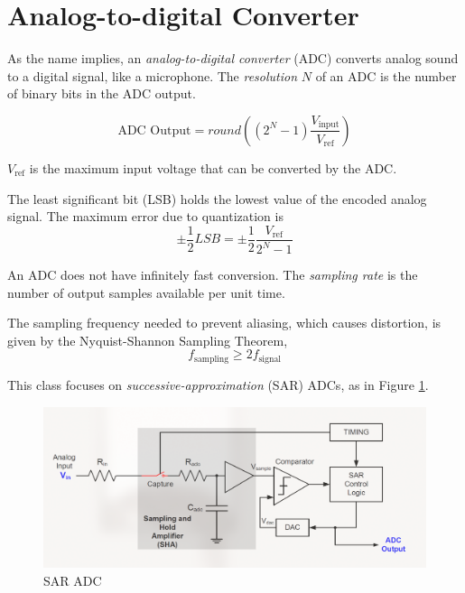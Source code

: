 \section{Analog-to-digital Converter}

As the name implies, an \emph{analog-to-digital converter}
(ADC) converts analog sound to a digital signal, like a
microphone.
The \emph{resolution} $N$ of an ADC is the number of binary bits
in the ADC output.

\begin{equation}
    \text{ADC Output} = round\left( (2^N - 1)\frac{V_{\text{input}}}{V_{\text{ref}}} \right)
\end{equation}

$V_{\text{ref}}$ is the maximum input voltage that can be converted by the ADC.

The least significant bit (LSB) holds the lowest value of the encoded
analog signal.
The maximum error due to quantization is
\begin{equation}
    \pm \frac{1}{2}LSB = \pm \frac{1}{2} \frac{V_\text{ref}}{2^N-1}
\end{equation}

An ADC does not have infinitely fast conversion. The \emph{sampling rate}
is the number of output samples available per unit time.

The sampling frequency needed to prevent aliasing, which causes distortion,
is given by the Nyquist-Shannon Sampling Theorem,
\begin{equation}
    f_{\text{sampling}} \geq 2f_{\text{signal}}
\end{equation}

This class focuses on \emph{successive-approximation} (SAR) ADCs,
as in Figure \ref{fig:saradc}.

\begin{figure}
    \includegraphics{images/saradc.png}
    \caption{SAR ADC}
    \label{fig:saradc}
\end{figure}

